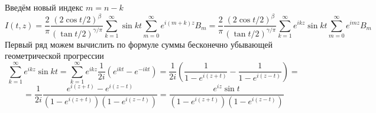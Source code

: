 \documentclass[12pt, a4paper]{article}
\begin{document}
	Введём новый индекс $m = n - k$
	\begin{equation*}
		I(t,z) = \dfrac{2}{\pi}\dfrac{(2\cos{t/2})^\beta}{(\tan{t/2})^{\gamma/\pi}} \sum\limits_{k=1}^{\infty} \sin{kt} \sum\limits_{m =0 }^{\infty} e^{i(m+k)z} B_{m} = 
		\dfrac{2}{\pi}\dfrac{(2\cos{t/2})^\beta}{(\tan{t/2})^{\gamma/\pi}} \sum\limits_{k=1}^{\infty} e^{ikz}\sin{kt} \sum\limits_{m =0 }^{\infty} e^{imz} B_{m}
	\end{equation*}
	Первый ряд можем вычислить по формуле суммы бесконечно убывающей геометрической прогрессии
	\begin{equation*}
		\sum\limits_{k=1}^{\infty} e^{ikz}\sin{kt} =  \sum\limits_{k=1}^{\infty} e^{ikz}\dfrac{1}{2i}\left(e^{ikt} - e^{-ikt}\right) = \dfrac1{2i} \left(\dfrac{1}{1 - e^{i(z+t)}} -  \dfrac{1}{1 - e^{i(z-t)}}\right) = 
	\end{equation*}
	\begin{equation*}
		= \dfrac{1}{2i}  \dfrac{e^{i(z+t)} - e^{i(z-t)}}{\left(1 - e^{i(z+t)} \right) \left(1 - e^{i(z-t)}\right)} =  \dfrac{e^{iz} \sin{t}}{\left(1 - e^{i(z+t)} \right) \left(1 - e^{i(z-t)}\right)}
	\end{equation*}
	
\end{document}
